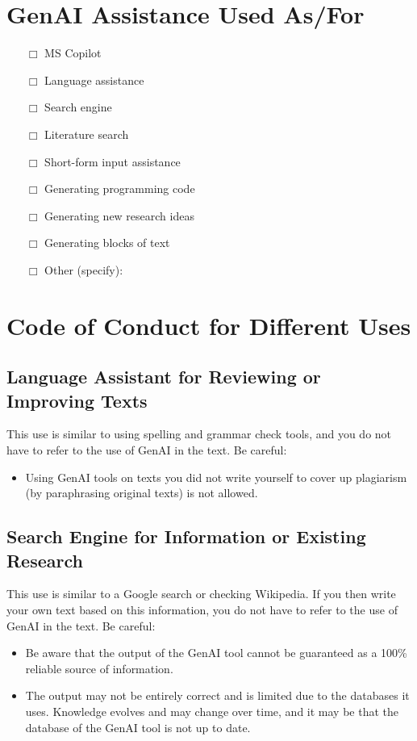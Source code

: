 \section*{GenAI Assistance Used As/For}
\begin{itemize}
    \item[$\Box$] MS Copilot \\
    \item[$\Box$] Language assistance \\
    \item[$\Box$] Search engine \\
    \item[$\Box$] Literature search \\
    \item[$\Box$] Short-form input assistance \\
    \item[$\Box$] Generating programming code \\
    \item[$\Box$] Generating new research ideas \\
    \item[$\Box$] Generating blocks of text \\
    \item[$\Box$] Other (specify): \underline{\hspace{5cm}}
\end{itemize}

\section*{Code of Conduct for Different Uses}
\subsection*{Language Assistant for Reviewing or Improving Texts}
This use is similar to using spelling and grammar check tools, and you do not have to refer to the use of GenAI in the text. Be careful:
\begin{itemize}
    \item Using GenAI tools on texts you did not write yourself to cover up plagiarism (by paraphrasing original texts) is not allowed.
\end{itemize}

\subsection*{Search Engine for Information or Existing Research}
This use is similar to a Google search or checking Wikipedia. If you then write your own text based on this information, you do not have to refer to the use of GenAI in the text. Be careful:
\begin{itemize}
    \item Be aware that the output of the GenAI tool cannot be guaranteed as a 100\% reliable source of information.
    \item The output may not be entirely correct and is limited due to the databases it uses. Knowledge evolves and may change over time, and it may be that the database of the GenAI tool is not up to date.
\end{itemize}


